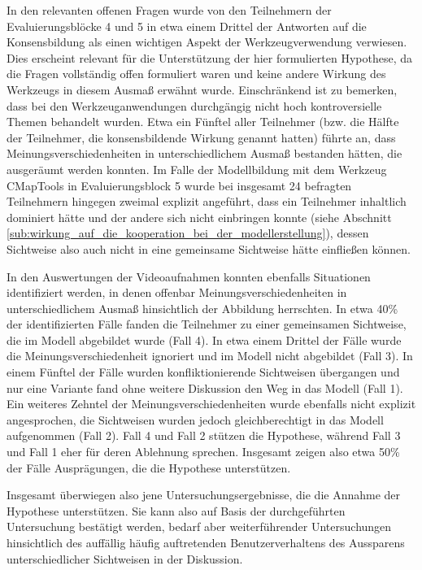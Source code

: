 In den relevanten offenen Fragen wurde von den Teilnehmern der Evaluierungsblöcke 4 und 5 in etwa einem Drittel der Antworten auf die Konsensbildung als einen wichtigen Aspekt der Werkzeugverwendung verwiesen. Dies erscheint relevant für die Unterstützung der hier formulierten Hypothese, da die Fragen vollständig offen formuliert waren und keine andere Wirkung des Werkzeugs in diesem Ausmaß erwähnt wurde. Einschränkend ist zu bemerken, dass bei den Werkzeuganwendungen durchgängig nicht hoch kontroversielle Themen behandelt wurden. Etwa ein Fünftel aller Teilnehmer (bzw. die Hälfte der Teilnehmer, die konsensbildende Wirkung genannt hatten) führte an, dass Meinungsverschiedenheiten in unterschiedlichem Ausmaß bestanden hätten, die ausgeräumt werden konnten. Im Falle der Modellbildung mit dem Werkzeug CMapTools in Evaluierungsblock 5 wurde bei insgesamt 24 befragten Teilnehmern hingegen zweimal explizit angeführt, dass ein Teilnehmer inhaltlich dominiert hätte und der andere sich nicht einbringen konnte (siehe Abschnitt \ref{sub:wirkung_auf_die_kooperation_bei_der_modellerstellung}), dessen Sichtweise also auch nicht in eine gemeinsame Sichtweise hätte einfließen können.

In den Auswertungen der Videoaufnahmen konnten ebenfalls Situationen identifiziert werden, in denen offenbar Meinungsverschiedenheiten in unterschiedlichem Ausmaß hinsichtlich der Abbildung herrschten. In etwa 40\% der identifizierten Fälle fanden die Teilnehmer zu einer gemeinsamen Sichtweise, die im Modell abgebildet wurde (Fall 4). In etwa einem Drittel der Fälle wurde die Meinungsverschiedenheit ignoriert und im Modell nicht abgebildet (Fall 3). In einem Fünftel der Fälle wurden konfliktionierende Sichtweisen übergangen und nur eine Variante fand ohne weitere Diskussion den Weg in das Modell (Fall 1). Ein weiteres Zehntel der Meinungsverschiedenheiten wurde ebenfalls nicht explizit angesprochen, die Sichtweisen wurden jedoch gleichberechtigt in das Modell aufgenommen (Fall 2). Fall 4 und Fall 2 stützen die Hypothese, während Fall 3 und Fall 1 eher für deren Ablehnung sprechen. Insgesamt zeigen also etwa 50\% der Fälle Ausprägungen, die die Hypothese unterstützen.   

Insgesamt überwiegen also jene Untersuchungsergebnisse, die die Annahme der Hypothese unterstützen. Sie kann also auf Basis der durchgeführten Untersuchung bestätigt werden, bedarf aber weiterführender Untersuchungen hinsichtlich des auffällig häufig auftretenden Benutzerverhaltens des Aussparens unterschiedlicher Sichtweisen in der Diskussion.

